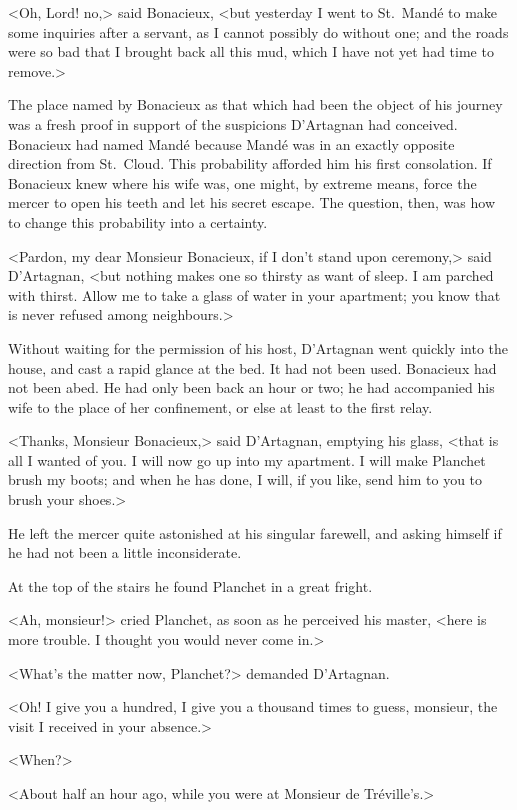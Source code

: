 <Oh, Lord! no,> said Bonacieux, <but yesterday I went to St.~Mandé to make some inquiries after a servant, as I cannot possibly do without one; and the roads were so bad that I brought back all this mud, which I have not yet had time to remove.> 

The place named by Bonacieux as that which had been the object of his journey was a fresh proof in support of the suspicions D'Artagnan had conceived. Bonacieux had named Mandé because Mandé was in an exactly opposite direction from St.~Cloud. This probability afforded him his first consolation. If Bonacieux knew where his wife was, one might, by extreme means, force the mercer to open his teeth and let his secret escape. The question, then, was how to change this probability into a certainty. 

<Pardon, my dear Monsieur Bonacieux, if I don't stand upon ceremony,> said D'Artagnan, <but nothing makes one so thirsty as want of sleep. I am parched with thirst. Allow me to take a glass of water in your apartment; you know that is never refused among neighbours.> 

Without waiting for the permission of his host, D'Artagnan went quickly into the house, and cast a rapid glance at the bed. It had not been used. Bonacieux had not been abed. He had only been back an hour or two; he had accompanied his wife to the place of her confinement, or else at least to the first relay. 

<Thanks, Monsieur Bonacieux,> said D'Artagnan, emptying his glass, <that is all I wanted of you. I will now go up into my apartment. I will make Planchet brush my boots; and when he has done, I will, if you like, send him to you to brush your shoes.> 

He left the mercer quite astonished at his singular farewell, and asking himself if he had not been a little inconsiderate. 

At the top of the stairs he found Planchet in a great fright. 

<Ah, monsieur!> cried Planchet, as soon as he perceived his master, <here is more trouble. I thought you would never come in.> 

<What's the matter now, Planchet?> demanded D'Artagnan. 

<Oh! I give you a hundred, I give you a thousand times to guess, monsieur, the visit I received in your absence.> 

<When?> 

<About half an hour ago, while you were at Monsieur de Tréville's.> 

